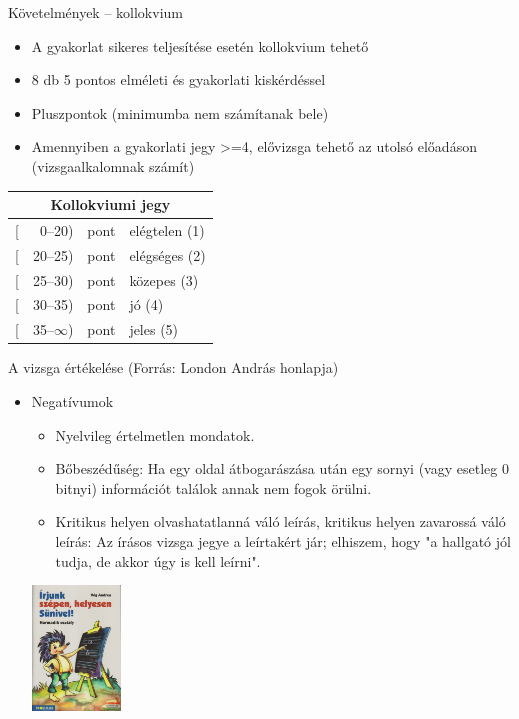 \documentclass{beamer}
\begin{document}
\begin{frame}{Követelmények -- kollokvium}
	\begin{itemize}
		\item A gyakorlat sikeres teljesítése esetén kollokvium tehető
		\item 8 db 5 pontos elméleti és gyakorlati kiskérdéssel
		\item Pluszpontok (minimumba nem számítanak bele)
		\item Amennyiben a gyakorlati jegy >=4, elővizsga tehető az utolsó 
		előadáson (vizsgaalkalomnak számít)
	\end{itemize}
	\pause	
		\begin{table}
		\centering
		\begin{tabular}{r@{}r@{ }ll}
			\multicolumn{4}{c}{Kollokviumi jegy} \\ \hline
			{[}&0--20)  & pont & elégtelen (1) \\
			{[}&20--25) & pont & elégséges (2) \\
			{[}&25--30) & pont & közepes (3) \\
			{[}&30--35) & pont & jó (4) \\
			{[}&35--$\infty$) & pont & jeles (5)
		\end{tabular}
	    \end{table}
\end{frame}

\begin{frame}{A vizsga értékelése (Forrás: London András honlapja)}
\begin{itemize}
	\item Negatívumok
	\begin{itemize}
		\item Nyelvileg értelmetlen mondatok.
		\item Bőbeszédűség: Ha egy oldal átbogarászása után egy sornyi (vagy 
		esetleg 0 bitnyi) információt találok annak nem fogok örülni.
		\item Kritikus helyen olvashatatlanná váló leírás, kritikus helyen 
		zavarossá váló leírás: Az írásos vizsga jegye a leírtakért jár; 
		elhiszem, hogy "a hallgató jól tudja, de akkor úgy is kell leírni".
	\end{itemize}
\pause
\includegraphics[height=9em]{573777}
\end{itemize}
\end{frame}
\end{document}
